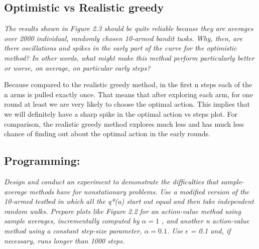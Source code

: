 \documentclass[12pt,a4paper]{article}
\begin{document}
\subsection{Optimistic vs Realistic greedy}
\textit{The results shown in Figure 2.3 should be quite reliable because they are averages over 2000 individual, randomly chosen 10-armed bandit tasks. Why, then, are there oscillations and spikes in the early part of the curve for the optimistic method? In other words, what might make this method perform particularly better or worse, on average, on particular early steps?}

Because compared to the realistic greedy method, in the first n steps each of the n arms is pulled exactly once. That means that after exploring each arm, for one round at least we are very likely to choose the optimal action. This  implies that we will definitely have a sharp spike in the optimal action vs steps plot. For comparison, the realistic greedy method explores much less and has much less chance of finding out about the optimal action in the early rounds. 

\subsection{Programming: }
\textit{Design and conduct an experiment to demonstrate the difficulties that sample-average methods have for nonstationary problems. Use a modified version of the 10-armed testbed in which all the q*(a) start out equal and then take independent random walks. Prepare plots like Figure 2.2 for an action-value method using sample averages, incrementally computed by $\alpha = 1$ , and another n action-value method using a constant step-size parameter, $\alpha= 0.1$. Use $\epsilon$ = 0.1 and, if necessary, runs longer than 1000 steps.} \\ 
\end{document}
